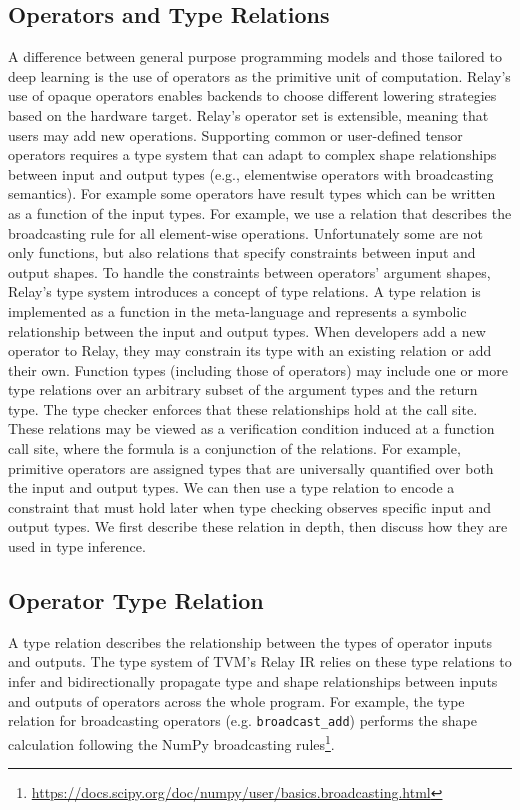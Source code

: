 \subsection{Operators and Type Relations}
A difference between general purpose programming models and those tailored to deep learning
  is the use of operators as the primitive unit of computation.
Relay's use of opaque operators enables backends to choose different
  lowering strategies based on the hardware target.
Relay's operator set is extensible, meaning that users may add new operations.
Supporting common or user-defined tensor operators requires
  a type system that can adapt to complex shape
  relationships between input and output types
(e.g., elementwise operators with broadcasting semantics).
For example some operators have result types which can be
  written as a function of the input types.
For example, we use a relation that describes the
  broadcasting rule for all element-wise operations.
Unfortunately some are not only functions,
  but also relations that specify constraints between input and output shapes.
To handle the constraints between operators' argument shapes,
  Relay's type system introduces a concept of type relations.
A type relation is implemented as a function in the
  meta-language and represents a symbolic relationship between
  the input and output types.
When developers add a new operator to Relay,
  they may constrain its type with an existing relation or add their own.
Function types (including those of operators) may include
  one or more type relations over an arbitrary subset
  of the argument types and the return type.
The type checker enforces that these relationships hold at the call site.
These relations may be viewed as a verification condition induced at a
  function call site, where the formula is a conjunction of the relations.
For example, primitive operators are assigned types that are universally
  quantified over both the input and output types.
We can then use a type relation to encode a constraint that must hold later
  when type checking observes specific input and output types.
We first describe these relation in depth, then discuss how they
  are used in type inference.

\subsection{Operator Type Relation}
A type relation describes the relationship between
  the types of operator inputs and outputs.
The type system of TVM's Relay IR relies on these
  type relations to infer and bidirectionally
  propagate type and shape relationships between
  inputs and outputs of operators across the whole program.
For example, the type relation for broadcasting operators (e.g. \texttt{broadcast\_add}) performs the shape
  calculation following the NumPy broadcasting rules\footnote{\url{https://docs.scipy.org/doc/numpy/user/basics.broadcasting.html}}.

